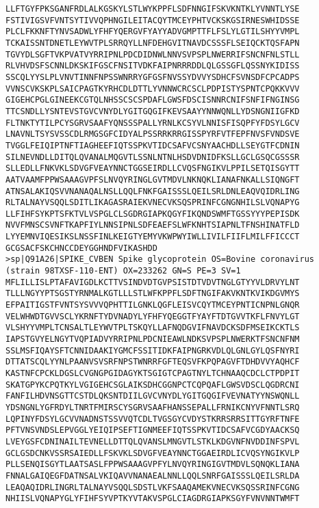 \documentclass[en,black,12pt,normal]{elegantnote}
\begin{document}
\begin{lstlisting}
LLFTGYFPKSGANFRDLALKGSKYLSTLWYKPPFLSDFNNGIFSKVKNTKLYVNNTLYSE
FSTIVIGSVFVNTSYTIVVQPHNGILEITACQYTMCEYPHTVCKSKGSIRNESWHIDSSE
PLCLFKKNFTYNVSADWLYFHFYQERGVFYAYYADVGMPTTFLFSLYLGTILSHYYVMPL
TCKAISSNTDNETLEYWVTPLSRRQYLLNFDEHGVITNAVDCSSSFLSEIQCKTQSFAPN
TGVYDLSGFTVKPVATVYRRIPNLPDCDIDNWLNNVSVPSPLNWERRIFSNCNFNLSTLL
RLVHVDSFSCNNLDKSKIFGSCFNSITVDKFAIPNRRRDDLQLGSSGFLQSSNYKIDISS
SSCQLYYSLPLVNVTINNFNPSSWNRRYGFGSFNVSSYDVVYSDHCFSVNSDFCPCADPS
VVNSCVKSKPLSAICPAGTKYRHCDLDTTLYVNNWCRCSCLPDPISTYSPNTCPQKKVVV
GIGEHCPGLGINEEKCGTQLNHSSCSCSPDAFLGWSFDSCISNNRCNIFSNFIFNGINSG
TTCSNDLLYSNTEVSTGVCVNYDLYGITGQGIFKEVSAAYYNNWQNLLYDSNGNIIGFKD
FLTNKTYTILPCYSGRVSAAFYQNSSSPALLYRNLKCSYVLNNISFISQPFYFDSYLGCV
LNAVNLTSYSVSSCDLRMGSGFCIDYALPSSRRKRRGISSPYRFVTFEPFNVSFVNDSVE
TVGGLFEIQIPTNFTIAGHEEFIQTSSPKVTIDCSAFVCSNYAACHDLLSEYGTFCDNIN
SILNEVNDLLDITQLQVANALMQGVTLSSNLNTNLHSDVDNIDFKSLLGCLGSQCGSSSR
SLLEDLLFNKVKLSDVGFVEAYNNCTGGSEIRDLLCVQSFNGIKVLPPILSETQISGYTT
AATVAAMFPPWSAAAGVPFSLNVQYRINGLGVTMDVLNKNQKLIANAFNKALLSIQNGFT
ATNSALAKIQSVVNANAQALNSLLQQLFNKFGAISSSLQEILSRLDNLEAQVQIDRLING
RLTALNAYVSQQLSDITLIKAGASRAIEKVNECVKSQSPRINFCGNGNHILSLVQNAPYG
LLFIHFSYKPTSFKTVLVSPGLCLSGDRGIAPKQGYFIKQNDSWMFTGSSYYYPEPISDK
NVVFMNSCSVNFTKAPFIYLNNSIPNLSDFEAEFSLWFKNHTSIAPNLTFNSHINATFLD
LYYEMNVIQESIKSLNSSFINLKEIGTYEMYVKWPWYIWLLIVILFIIFLMILFFICCCT
GCGSACFSKCHNCCDEYGGHNDFVIKASHDD
>sp|Q91A26|SPIKE_CVBEN Spike glycoprotein OS=Bovine coronavirus (strain 98TXSF-110-ENT) OX=233262 GN=S PE=3 SV=1
MFLILLISLPTAFAVIGDLKCTTVSINDVDTGVPSISTDTVDVTNGLGTYYVLDRVYLNT
TLLLNGYYPTSGSTYRNMALKGTLLLSTLWFKPPFLSDFTNGIFAKVKNTKVIKDGVMYS
EFPAITIGSTFVNTSYSVVVQPHTTILGNKLQGFLEISVCQYTMCEYPNTICNPNLGNQR
VELWHWDTGVVSCLYKRNFTYDVNADYLYFHFYQEGGTFYAYFTDTGVVTKFLFNVYLGT
VLSHYYVMPLTCNSALTLEYWVTPLTSKQYLLAFNQDGVIFNAVDCKSDFMSEIKCKTLS
IAPSTGVYELNGYTVQPIADVYRRIPNLPDCNIEAWLNDKSVPSPLNWERKTFSNCNFNM
SSLMSFIQAYSFTCNNIDAAKIYGMCFSSITIDKFAIPNGRKVDLQLGNLGYLQSFNYRI
DTTATSCQLYYNLPAANVSVSRFNPSTWNRRFGFTEQSVFKPQPAGVFTDHDVVYAQHCF
KASTNFCPCKLDGSLCVGNGPGIDAGYKTSGIGTCPAGTNYLTCHNAAQCDCLCTPDPIT
SKATGPYKCPQTKYLVGIGEHCSGLAIKSDHCGGNPCTCQPQAFLGWSVDSCLQGDRCNI
FANFILHDVNSGTTCSTDLQKSNTDIILGVCVNYDLYGITGQGIFVEVNATYYNSWQNLL
YDSNGNLYGFRDYLTNRTFMIRSCYSGRVSAAFHANSSEPALLFRNIKCNYVFNNTLSRQ
LQPINYFDSYLGCVVNADNSTSSVVQTCDLTVGSGYCVDYSTKRRSRRSITTGYRFTNFE
PFTVNSVNDSLEPVGGLYEIQIPSEFTIGNMEEFIQTSSPKVTIDCSAFVCGDYAACKSQ
LVEYGSFCDNINAILTEVNELLDTTQLQVANSLMNGVTLSTKLKDGVNFNVDDINFSPVL
GCLGSDCNKVSSRSAIEDLLFSKVKLSDVGFVEAYNNCTGGAEIRDLICVQSYNGIKVLP
PLLSENQISGYTLAATSASLFPPWSAAAGVPFYLNVQYRINGIGVTMDVLSQNQKLIANA
FNNALGAIQEGFDATNSALVKIQAVVNANAEALNNLLQQLSNRFGAISSSLQEILSRLDA
LEAQAQIDRLINGRLTALNAYVSQQLSDSTLVKFSAAQAMEKVNECVKSQSSRINFCGNG
NHIISLVQNAPYGLYFIHFSYVPTKYVTAKVSPGLCIAGDRGIAPKSGYFVNVNNTWMFT

\end{lstlisting}
\end{document}
